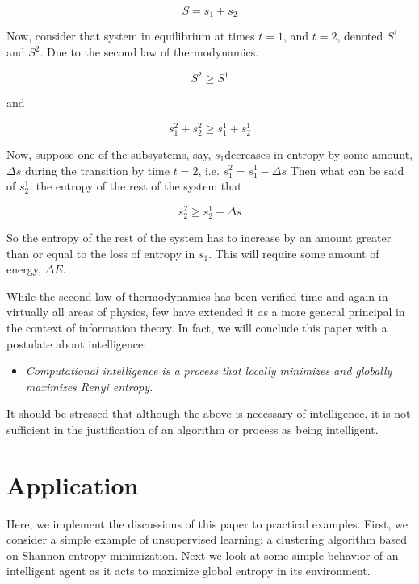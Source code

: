 \documentclass[english]{article}
\begin{document}
\begin{equation}
S=s_{1}+s_{2}
\end{equation}


Now, consider that system in equilibrium at times $t=1$, and $t=2$,
denoted $S^{1}$ and $S^{2}$. Due to the second law of thermodynamics.

\begin{equation}
S^{2}\geq S^{1}
\end{equation}


and

\begin{equation}
s_{1}^{2}+s_{2}^{2}\geq s_{1}^{1}+s_{2}^{1}
\end{equation}


Now, suppose one of the subsystems, say, $s_{1}$decreases in entropy
by some amount, $\Delta s$ during the transition by time $t=2$,
i.e. $s_{1}^{2}=s_{1}^{1}-\Delta s$ Then what can be said of $s_{2}^{1}$,
the entropy of the rest of the system that

\begin{equation}
s_{2}^{2}\geq s_{2}^{1}+\Delta s
\end{equation}


So the entropy of the rest of the system has to increase by an amount
greater than or equal to the loss of entropy in $s_{1}$. This will
require some amount of energy, $\Delta E$.

While the second law of thermodynamics has been verified time and
again in virtually all areas of physics, few have extended it as a
more general principal in the context of information theory. In fact,
we will conclude this paper with a postulate about intelligence:
\begin{itemize}
\item \emph{Computational intelligence is a process that locally minimizes
and globally maximizes Renyi entropy.}
\end{itemize}
It should be stressed that although the above is necessary of intelligence,
it is not sufficient in the justification of an algorithm or process
as being intelligent.


\section{Application\label{sec:Application}}

Here, we implement the discussions of this paper to practical examples.
First, we consider a simple example of unsupervised learning; a clustering
algorithm based on Shannon entropy minimization. Next we look at some
simple behavior of an intelligent agent as it acts to maximize global
entropy in its environment.
\end{document}
